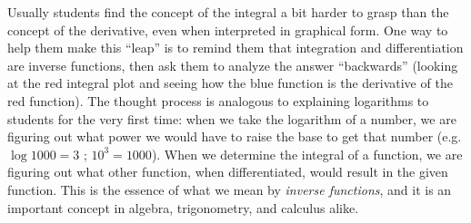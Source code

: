 
Usually students find the concept of the integral a bit harder to grasp than the concept of the derivative, even when interpreted in graphical form.  One way to help them make this ``leap'' is to remind them that integration and differentiation are inverse functions, then ask them to analyze the answer ``backwards'' (looking at the red integral plot and seeing how the blue function is the derivative of the red function).  The thought process is analogous to explaining logarithms to students for the very first time: when we take the logarithm of a number, we are figuring out what power we would have to raise the base to get that number (e.g. $\log 1000 = 3$ ; $10^3 = 1000$).  When we determine the integral of a function, we are figuring out what other function, when differentiated, would result in the given function.  This is the essence of what we mean by {\it inverse functions}, and it is an important concept in algebra, trigonometry, and calculus alike.




